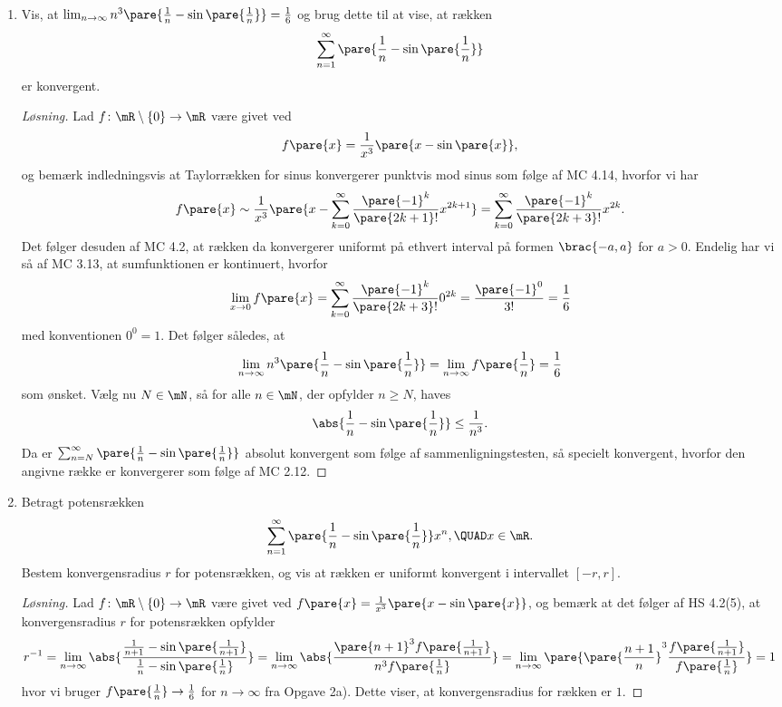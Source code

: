 \begin{opg}\hfill
\begin{enumerate}
    \item Vis, at
    $ \lim_{n\to\infty} n^3\pare{\frac{1}{n}-\sin\pare{\frac{1}{n}}}
        = \frac{1}{6} $
    og brug dette til at vise, at rækken
    $$ \sum_{n=1}^\infty \pare{\frac{1}{n} - \sin\pare{\frac{1}{n}}} $$
    er konvergent.
    
    
    \begin{proof}[Løsning]
    Lad $f\colon\mR\setminus\{0\}\to\mR$ være givet ved
    $$ f\pare{x} = \frac{1}{x^3}\pare{x-\sin\pare{x}}, $$
    og bemærk indledningsvis at Taylorrækken for sinus konvergerer punktvis mod sinus som følge af MC 4.14, hvorfor vi har
    $$ f\pare{x} \sim 
    \frac{1}{x^3}\pare{x - \sum_{k=0}^\infty \frac{\pare{-1}^k}{\pare{2k+1}!} x^{2k+1}} = \sum_{k=0}^\infty \frac{\pare{-1}^k}{\pare{2k+3}!}x^{2k}. $$
    Det følger desuden af MC 4.2, at rækken da konvergerer uniformt på ethvert interval på formen $\brac{-a,a}$ for $a>0$. Endelig har vi så af MC 3.13, at sumfunktionen er kontinuert, hvorfor
    $$ \lim_{x\to 0} f\pare{x} = \sum_{k=0}^\infty
            \frac{\pare{-1}^k}{\pare{2k+3}!}0^{2k}
        = \frac{\pare{-1}^0}{3!} = \frac{1}{6} $$
    med konventionen $0^0 = 1$.
    Det følger således, at 
    $$ \lim_{n\to\infty} n^3\pare{\frac{1}{n} - \sin\pare{\frac{1}{n}}}     = \lim_{n\to\infty} f\pare{\frac{1}{n}}
        = \frac{1}{6} $$
    som ønsket. Vælg nu $N\in\mN$, så for alle $n\in\mN$, der opfylder $n\geq N$, haves
    $$ \abs{\frac{1}{n}-\sin\pare{\frac{1}{n}}} \leq \frac{1}{n^3}. $$
    Da er $\sum_{n=N}^\infty \pare{\frac{1}{n}-\sin\pare{\frac{1}{n}}}$ absolut konvergent som følge af sammenligningstesten, så specielt konvergent, hvorfor den angivne række er konvergerer som følge af MC 2.12.
    \end{proof}
    
    
    \item Betragt potensrækken
    $$ \sum_{n=1}^\infty \pare{\frac{1}{n}-\sin\pare{\frac{1}{n}}}x^n, 
        \QUAD x\in\mR. $$
    Bestem konvergensradius $r$ for potensrækken, og vis at rækken er uniformt konvergent i intervallet $[-r,r]$.

    
    \begin{proof}[Løsning]
    Lad $f\colon\mR\setminus\{0\}\to\mR$ være givet ved $f\pare{x} = \frac{1}{x^3}\pare{x-\sin\pare{x}}$, og bemærk at det følger af HS 4.2(5), at konvergensradius $r$ for potensrækken opfylder
    $$ r^{-1}
        = \lim_{n\to\infty}\abs{\frac{\frac{1}{n+1}-\sin\pare{\frac{1}{n+1}}}
            {\frac{1}{n}-\sin\pare{\frac{1}{n}}}}
        = \lim_{n\to\infty}\abs{\frac{\pare{n+1}^3f\pare{\frac{1}{n+1}}}{n^3f\pare{\frac{1}{n}}}} = \lim_{n\to\infty} \pare{\pare{\frac{n+1}{n}}^3\frac{f\pare{\frac{1}{n+1}}}
            {f\pare{\frac{1}{n}}}} = 1 $$
    hvor vi bruger $f\pare{\frac{1}{n}}\to \frac{1}{6}$ for $n\to\infty$ fra Opgave 2a). Dette viser, at konvergensradius for rækken er $1$. 
    

\end{proof}
\end{enumerate}
\end{opg}
